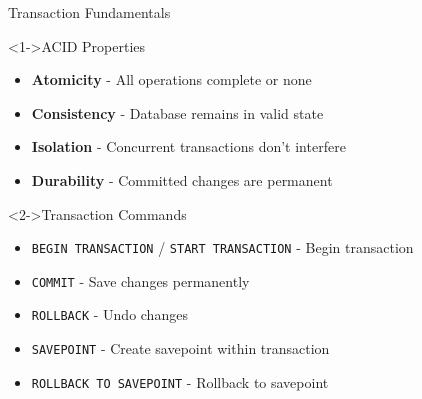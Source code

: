 \documentclass[aspectratio=169,11pt]{beamer}
\begin{document}
\begin{frame}{Transaction Fundamentals}
\begin{block}<1->{ACID Properties}
\begin{itemize}
    \item \textbf{Atomicity} - All operations complete or none
    \item \textbf{Consistency} - Database remains in valid state
    \item \textbf{Isolation} - Concurrent transactions don't interfere
    \item \textbf{Durability} - Committed changes are permanent
\end{itemize}
\end{block}

\pause
\begin{block}<2->{Transaction Commands}
\begin{itemize}
    \item \texttt{BEGIN TRANSACTION} / \texttt{START TRANSACTION} - Begin transaction
    \item \texttt{COMMIT} - Save changes permanently
    \item \texttt{ROLLBACK} - Undo changes
    \item \texttt{SAVEPOINT} - Create savepoint within transaction
    \item \texttt{ROLLBACK TO SAVEPOINT} - Rollback to savepoint
\end{itemize}
\end{block}
\end{frame}
\end{document}
